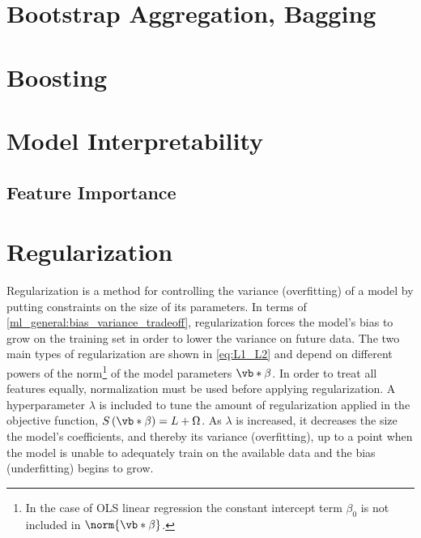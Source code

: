 \section{Bootstrap Aggregation, \texorpdfstring{\ie}{ie} Bagging}
\label{ml_general:bagging}

\section{Boosting}
\label{ml_general:boosting}


\section{Model Interpretability}
\label{ml_general:interp}

\subsection{Feature Importance}
\label{ml_general:interp:feature_importance}

\section{Regularization}
\label{ml_general:reg}

Regularization is a method for controlling the variance (overfitting)
of a model by putting constraints on the size of its parameters.
In terms of \cref{ml_general:bias_variance_tradeoff}, regularization forces the model's
bias to grow on the training set in order to lower the variance on future data.
The two main types of regularization are shown in \cref{eq:L1_L2}
and depend on different powers of the norm\footnote{In
the case of OLS linear regression the constant intercept term $\beta_{0}$ is not included in $\norm{\vb*{\beta}}$.} of the model parameters $\vb*{\beta}$.
In order to treat all features equally, normalization must be used before applying regularization.
A hyperparameter $\lambda$ is included to tune the amount of regularization applied in the objective function,
$S\left(\vb*{\beta}\right) = L + \Omega$.
As $\lambda$ is increased, it decreases the size the model's coefficients, and thereby its variance (overfitting),
up to a point when the model is unable to adequately train on the available data and the bias (underfitting) begins to grow.

